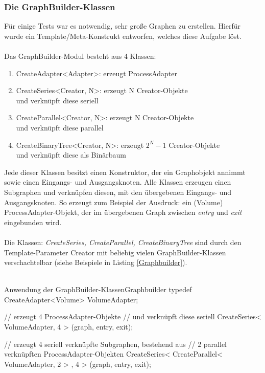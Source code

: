 \subsubsection{Die GraphBuilder-Klassen}
Für einige Tests war es notwendig, sehr große Graphen zu erstellen. Hierfür wurde ein Template/Meta-Konstrukt entworfen, welches diese Aufgabe löst. 
\\\\
Das GraphBuilder-Modul besteht aus 4 Klassen:
\begin{enumerate}
	\item CreateAdapter<Adapter>: erzeugt ProcessAdapter
	\item CreateSeries<Creator, N>: erzeugt N Creator-Objekte \\
		  und verknüpft diese seriell
	\item CreateParallel<Creator, N>: erzeugt N Creator-Objekte \\
		  und verknüpft diese parallel
	\item CreateBinaryTree<Creator, N>: erzeugt $2^N-1$ Creator-Objekte \\
		  und verknüpft diese als Binärbaum
\end{enumerate}
Jede dieser Klassen besitzt einen Konstruktor, der ein Graphobjekt annimmt sowie einen Eingangs- und Ausgangsknoten. Alle Klassen erzeugen einen Subgraphen und verknüpfen diesen, mit den übergebenen Eingangs- und Ausgangsknoten.
So erzeugt zum Beispiel der Ausdruck: 
ein (Volume) ProcessAdapter-Objekt, der im übergebenen Graph zwischen \emph{entry} und \emph{exit} eingebunden wird.
\\\\
Die Klassen: \emph{CreateSeries, CreateParallel, CreateBinaryTree} sind durch den Template-Parameter Creator  
mit beliebig vielen GraphBuilder-Klassen verschachtelbar (siehe Beispiele in Listing \ref{Graphbuilder}). 
\\\\
\begin{code}{Anwendung der GraphBuilder-Klassen}{Graphbuilder}
typedef CreateAdapter<Volume> VolumeAdapter;

// erzeugt 4 ProcessAdapter-Objekte 
// und verknüpft diese seriell
CreateSeries< VolumeAdapter, 4 > 
	(graph, entry, exit);

// erzeugt 4 seriell verknüpfte Subgraphen, bestehend aus
// 2 parallel verknüpften ProcessAdapter-Objekten 
CreateSeries< CreateParallel< VolumeAdapter, 2 > , 4 > 
	(graph, entry, exit);

\end{code} 

